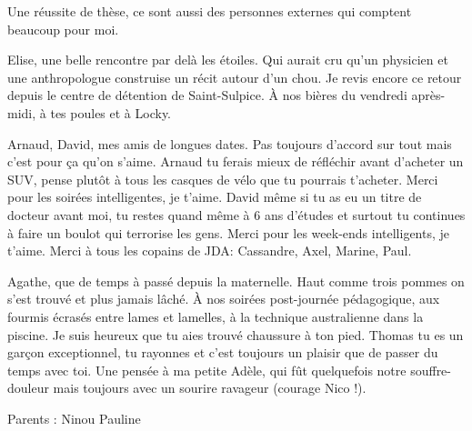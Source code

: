 Une réussite de thèse, ce sont aussi des personnes externes qui comptent beaucoup pour moi.

Elise, une belle rencontre par delà les étoiles. Qui aurait cru qu'un physicien et une anthropologue construise un récit autour d'un chou. Je revis encore ce retour depuis le centre de détention de Saint-Sulpice. À nos bières du vendredi après-midi, à tes poules et à Locky.

Arnaud, David, mes amis de longues dates. Pas toujours d'accord sur tout mais c'est pour ça qu'on s'aime. Arnaud tu ferais mieux de réfléchir avant d'acheter un SUV, pense plutôt à tous les casques de vélo que tu pourrais t’acheter. Merci pour les soirées intelligentes, je t’aime.
David même si tu as eu un titre de docteur avant moi, tu restes quand même à 6 ans d'études et surtout tu continues à faire un boulot qui terrorise les gens. Merci pour les week-ends intelligents, je t’aime.
Merci à tous les copains de JDA: Cassandre, Axel, Marine, Paul.

Agathe, que de temps à passé depuis la maternelle. Haut comme trois pommes on s'est trouvé et plus jamais lâché. À nos soirées post-journée pédagogique, aux fourmis écrasés entre lames et lamelles, à la technique australienne dans la piscine. Je suis heureux que tu aies trouvé chaussure à ton pied. Thomas tu es un garçon exceptionnel, tu rayonnes et c'est toujours un plaisir que de passer du temps avec toi. 
Une pensée à ma petite Adèle, qui fût quelquefois notre souffre-douleur mais toujours avec un sourire ravageur (courage Nico !).

Parents : Ninou
Pauline